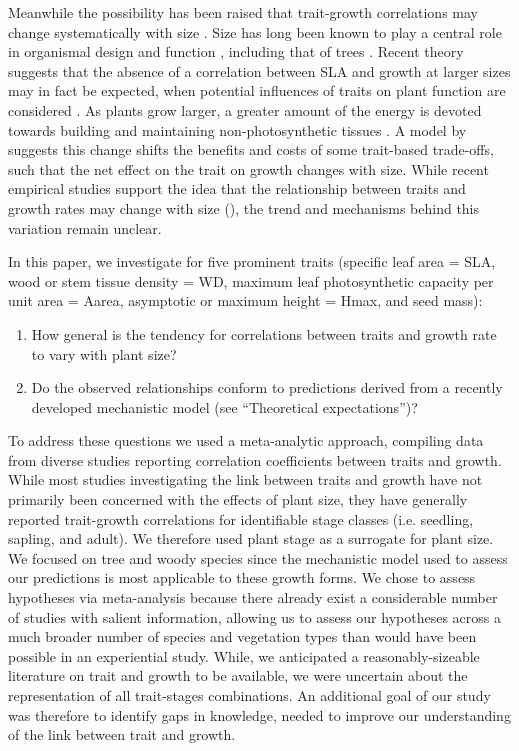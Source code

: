 \documentclass[a4paper,11pt]{article}
\begin{document}
Meanwhile the possibility has been raised that trait-growth correlations may change systematically with size \citep{King-1999,Falster:2011ii, Ruger:2012jv, Iida:2014ep, Iida:2014hq}. Size has long been known to play a central role in organismal design and function \citep{Vogel:1988ux, Vogel:2003wb}, including that of trees \citep{Farnsworth:1995im, Givnish:1995ta}. Recent theory suggests that the absence of a correlation between SLA and growth at larger sizes may in fact be expected, when potential influences of traits on plant function are considered \citep{Falster:2011ii}. As plants grow larger, a greater amount of the energy is devoted towards building and maintaining non-photosynthetic tissues \citep{Givnish:1995ta}. A model by \citet{Falster:2011ii} suggests this change shifts the benefits and costs of some trait-based trade-offs, such that the net effect on the trait on growth changes with size. While recent empirical studies support the idea that the relationship between traits and growth rates may change with size (\citealt{Iida:2014ep, Iida:2014hq}), the trend and mechanisms behind this variation remain unclear.

In this paper, we investigate for five prominent traits (specific leaf area = SLA, wood or stem tissue density = WD, maximum leaf photosynthetic capacity per unit area = Aarea, asymptotic or maximum height = Hmax, and seed mass):
\begin{enumerate}
  \item How general is the tendency for correlations between traits and growth rate to vary with plant size?
  \item Do the observed relationships conform to predictions derived from a recently developed mechanistic model \citep{Falster:2011ii} (see ``Theoretical expectations'')?
\end{enumerate}
To address these questions we used a meta-analytic approach, compiling data from diverse studies reporting correlation coefficients between traits and growth. While most studies investigating the link between traits and growth have not primarily been concerned with the effects of plant size, they have generally reported trait-growth correlations for identifiable stage classes (i.e. seedling, sapling, and adult). We therefore used plant stage as a surrogate for plant size. We focused on tree and woody species since the mechanistic model used to assess our predictions is most applicable to these growth forms. We chose to assess hypotheses via meta-analysis because there already exist a considerable number of studies with salient information, allowing us to assess our hypotheses across a much broader number of species and vegetation types than would have been possible in an experiential study. While, we anticipated a reasonably-sizeable literature on trait and growth to be available, we were uncertain about the representation of all trait-stages combinations. An additional goal of our study was therefore to identify gaps in knowledge, needed to improve our understanding of the link between trait and growth.
\end{document}
